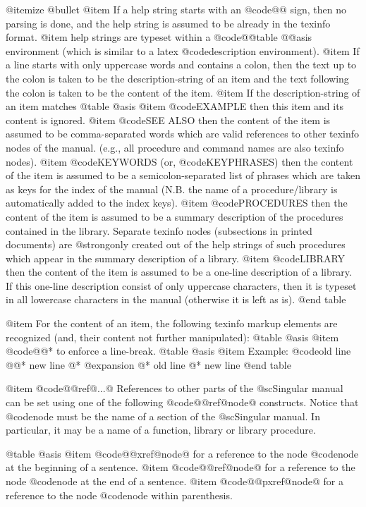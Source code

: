 {{{{@itemize @bullet
@item
If a help string starts with an @code{@@} sign, then no parsing is done,
and the help string is assumed to be already in the texinfo format.
@item
help strings are typeset within a @code{@@table @@asis} environment
(which is similar to a latex @code{description} environment).
@item
If a line starts with  only uppercase words and contains a colon, then
the text up
to the colon is taken to be the description-string of an item and the
text following the colon is taken to be the content of the item.
@item
If the description-string of an item matches
@table @asis
@item @code{EXAMPLE}
then this item and its content is ignored.
@item @code{SEE ALSO}
then the
content of the item is assumed to be comma-separated words which are
valid references to other texinfo nodes of the manual. (e.g., all
procedure and command names are also texinfo nodes).
@item  @code{KEYWORDS} (or, @code{KEYPHRASES})
then the content of the item is assumed to be a
semicolon-separated list of phrases which are taken as keys for the
index of the manual (N.B. the name of a procedure/library is
automatically added to the index keys).
@item @code{PROCEDURES}
then the
content of the item is assumed to be a summary description of the
procedures contained in the library. Separate texinfo nodes (subsections
in printed documents) are
@strong{only} created out of the help strings of such procedures which
appear in the summary description of a library.
@item @code{LIBRARY}
then the content of the item is assumed to be a one-line description of
a library. If this one-line description consist of only uppercase
characters, then it is typeset in all lowercase characters in the
manual (otherwise it is left as is).
@end table

@item
For the content of an item, the following texinfo markup elements
are recognized (and, their content not further manipulated):
@table @asis
@item @code{@@*}
to enforce a line-break.
@table @asis
@item Example:
@code{old line @@* new line}
@* @expansion{}
@* old line @* new line
@end table

@item @code{@@ref@{...@}}
References to other parts of the @sc{Singular} manual can be set using
one of the following @code{@@ref@{node@}} constructs. Notice that
@code{node} must be the name of a section of the @sc{Singular}
manual. In particular, it may be a name of a function, library or library
procedure.

@table @asis
@item @code{@@xref@{node@}}
for a reference to the node @code{node} at the beginning of a sentence.
@item @code{@@ref@{node@}}
for a reference to the node @code{node} at the end of a sentence.
@item @code{@@pxref@{node@}}
for a reference to the node @code{node} within parenthesis.

}}}}
